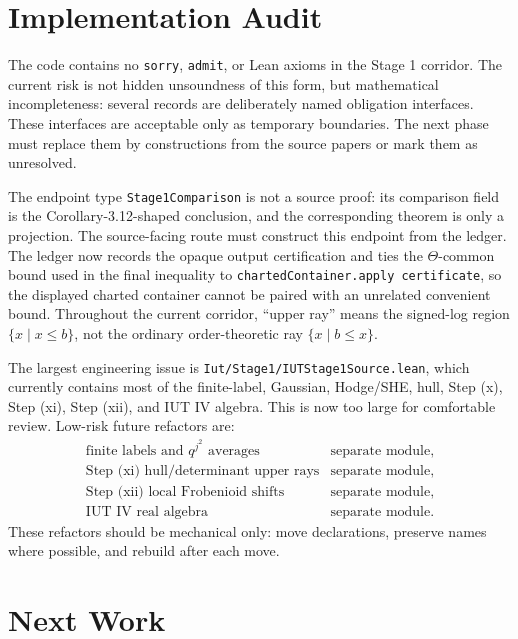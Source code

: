 \documentclass[11pt]{article}
\newcommand{\IUT}{IUT}
\theoremstyle{plain}
\theoremstyle{definition}
\theoremstyle{remark}
\begin{document}
\section{Implementation Audit}

The code contains no \texttt{sorry}, \texttt{admit}, or Lean axioms in the
Stage 1 corridor.  The current risk is not hidden unsoundness of this form, but
mathematical incompleteness: several records are deliberately named
obligation interfaces.  These interfaces are acceptable only as temporary
boundaries.  The next phase must replace them by constructions from the source
papers or mark them as unresolved.

The endpoint type \texttt{Stage1Comparison} is not a source proof: its
comparison field is the Corollary-3.12-shaped conclusion, and the corresponding
theorem is only a projection.  The source-facing route must construct this
endpoint from the ledger.  The ledger now records the opaque output
certification and ties the \(\Theta\)-common bound used in the final inequality
to \texttt{chartedContainer.apply certificate}, so the displayed charted
container cannot be paired with an unrelated convenient bound.  Throughout the
current corridor, ``upper ray'' means the signed-log region
\(\{x\mid x\le b\}\), not the ordinary order-theoretic ray \(\{x\mid b\le x\}\).

The largest engineering issue is
\texttt{Iut/Stage1/IUTStage1Source.lean}, which currently contains most of the
finite-label, Gaussian, Hodge/SHE, hull, Step (x), Step (xi), Step (xii), and
\IUT{} IV algebra.  This is now too large for comfortable review.  Low-risk
future refactors are:
\[
\begin{array}{ll}
\text{finite labels and }q^{j^2}\text{ averages} & \text{separate module},\\
\text{Step (xi) hull/determinant upper rays} & \text{separate module},\\
\text{Step (xii) local Frobenioid shifts} & \text{separate module},\\
\text{\IUT{} IV real algebra} & \text{separate module}.
\end{array}
\]
These refactors should be mechanical only: move declarations, preserve names
where possible, and rebuild after each move.

\section{Next Work}
\end{document}
